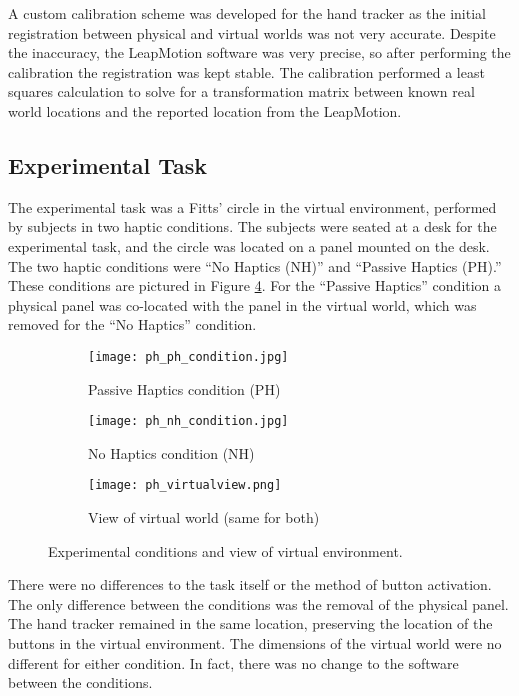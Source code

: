 A custom calibration scheme was developed for the hand tracker as the initial registration between physical and virtual worlds was not very accurate.
Despite the inaccuracy, the LeapMotion software was very precise, so after performing the calibration the registration was kept stable.
The calibration performed a least squares calculation to solve for a transformation matrix between known real world locations and the reported location from the LeapMotion.

\subsection{Experimental Task}

The experimental task was a Fitts' circle in the virtual environment, performed by subjects in two haptic conditions.
The subjects were seated at a desk for the experimental task, and the circle was located on a panel mounted on the desk.
The two haptic conditions were ``No Haptics (NH)'' and ``Passive Haptics (PH).''
These conditions are pictured in Figure \ref{fig:ph_conditions}.
For the ``Passive Haptics'' condition a physical panel was co-located with the panel in the virtual world, which was removed for the ``No Haptics'' condition.

\begin{figure}
    \centering
    \begin{subfigure}[t]{0.32\linewidth}
        \centering
        \texttt{[image: ph\_ph\_condition.jpg]}
        \caption{Passive Haptics condition (PH)}
        \label{fig:ph_conditions:ph_condition}
    \end{subfigure}
    \begin{subfigure}[t]{0.32\linewidth}
        \centering
        \texttt{[image: ph\_nh\_condition.jpg]}
        \caption{No Haptics condition (NH)}
        \label{fig:ph_conditions:nh_condition}
    \end{subfigure}
    \begin{subfigure}[t]{0.32\linewidth}
        \centering
        \texttt{[image: ph\_virtualview.png]}
        \caption{View of virtual world (same for both)}
        \label{fig:ph_conditions:virtual}
    \end{subfigure}
    \caption{Experimental conditions and view of virtual environment.}
    \label{fig:ph_conditions}
\end{figure}

There were no differences to the task itself or the method of button activation.
The only difference between the conditions was the removal of the physical panel.
The hand tracker remained in the same location, preserving the location of the buttons in the virtual environment.
The dimensions of the virtual world were no different for either condition.
In fact, there was no change to the software between the conditions.

